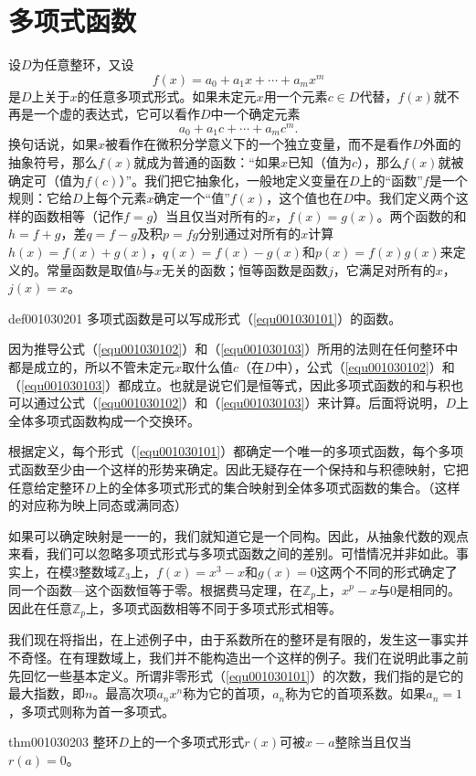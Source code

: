 \section{多项式函数}\label{subsection0010302}
设$D$为任意整环，又设
\[
f(x)=a_0+a_1x+\cdots+a_mx^m
\]
是$D$上关于$x$的任意多项式形式。如果未定元$x$用一个元素$c \in D$代替，$f(x)$就不再是一个虚的表达式，它可以看作$D$中一个确定元素
\[
a_0+a_1c+\cdots+a_mc^m.
\] 
换句话说，如果$x$被看作在微积分学意义下的一个独立变量，而不是看作$D$外面的抽象符号，那么$f(x)$就成为普通的函数：“如果$x$已知（值为$c$），那么$f(x)$就被确定可（值为$f(c)$）”。我们把它抽象化，一般地定义变量在$D$上的“函数”$f$是一个规则：它给$D$上每个元素$x$确定一个“值”$f(x)$，这个值也在$D$中。我们定义两个这样的函数相等（记作$f=g$）当且仅当对所有的$x$，$f(x)=g(x)$。两个函数的和$h=f+g$，差$q=f-g$及积$p=fg$分别通过对所有的$x$计算$h(x) = f(x)+g(x)$，$q(x)=f(x)-g(x)$和$p(x)=f(x)g(x)$来定义的。常量函数是取值$b$与$x$无关的函数；恒等函数是函数$j$，它满足对所有的$x$，$j(x)=x$。
\begin{definition}{}{def001030201}
多项式函数是可以写成形式（\ref{equ001030101}）的函数。
\end{definition}

因为推导公式（\ref{equ001030102}）和（\ref{equ001030103}）所用的法则在任何整环中都是成立的，所以不管未定元$x$取什么值$c$（在$D$中），公式（\ref{equ001030102}）和（\ref{equ001030103}）都成立。也就是说它们是恒等式，因此多项式函数的和与积也可以通过公式（\ref{equ001030102}）和（\ref{equ001030103}）来计算。后面将说明，$D$上全体多项式函数构成一个交换环。

根据定义，每个形式（\ref{equ001030101}）都确定一个唯一的多项式函数，每个多项式函数至少由一个这样的形势来确定。因此无疑存在一个保持和与积德映射，它把任意给定整环$D$上的全体多项式形式的集合映射到全体多项式函数的集合。（这样的对应称为映上同态或满同态）

如果可以确定映射是一一的，我们就知道它是一个同构。因此，从抽象代数的观点来看，我们可以忽略多项式形式与多项式函数之间的差别。可惜情况并非如此。事实上，在模3整数域$\mathbb{Z}_3$上，$f(x)=x^3-x$和$g(x)=0$这两个不同的形式确定了同一个函数---这个函数恒等于零。根据费马定理，在$\mathbb{Z}_p$上，$x^p-x$与0是相同的。因此在任意$\mathbb{Z}_p$上，多项式函数相等不同于多项式形式相等。

我们现在将指出，在上述例子中，由于系数所在的整环是有限的，发生这一事实并不奇怪。在有理数域上，我们并不能构造出一个这样的例子。我们在说明此事之前先回忆一些基本定义。所谓非零形式（\ref{equ001030101}）的次数，我们指的是它的最大指数，即$n$。最高次项$a_nx^n$称为它的首项，$a_n$称为它的首项系数。如果$a_n=1$，多项式则称为首一多项式。
\begin{theorem}{}{thm001030203}
整环$D$上的一个多项式形式$r(x)$可被$x-a$整除当且仅当$r(a)=0$。
\end{theorem}

